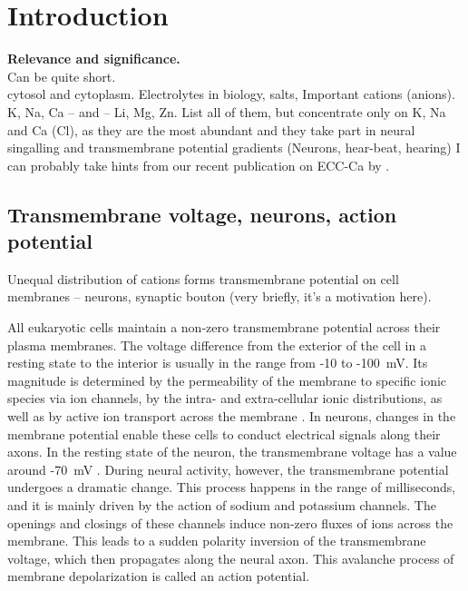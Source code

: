 \chapter*{Introduction}

 \textbf{Relevance and significance.} \\
 Can be quite short. \\
 cytosol and cytoplasm. Electrolytes in biology, salts, Important cations (anions). 
 K, Na, Ca -- and -- Li, Mg, Zn.
 List all of them, but concentrate only on K, Na and Ca (Cl), as they are the most abundant and they take part in neural singalling and transmembrane potential gradients (Neurons, hear-beat, hearing)
 I can probably take hints from our recent publication on ECC-Ca by \citet{martinek17}. 

\section{Transmembrane voltage, neurons, action potential}

 Unequal distribution of cations forms transmembrane potential on cell membranes -- neurons, synaptic bouton (very briefly, it's a motivation here). 

All eukaryotic cells maintain a non-zero transmembrane potential across their plasma membranes. 
The voltage difference from the exterior of the cell in a resting state to the interior is usually in the range from -10 to -100~mV. \cite{MolBiolCell, sten-knudsen_biological_2002} 
Its magnitude is determined by the permeability of the membrane to specific ionic species via ion channels, by the intra- and extra-cellular ionic distributions, as well as by active ion transport across the membrane  \cite{sten-knudsen_biological_2002}. 
In neurons, changes in the membrane potential enable these cells to conduct electrical signals along their axons.  
In the resting state of the neuron, the transmembrane voltage has a value around -70~mV \cite{sten-knudsen_biological_2002}. 
During neural activity, however, the transmembrane potential undergoes a dramatic change. 
This process happens in the range of milliseconds, and it is mainly driven by the action of sodium and potassium channels. 
The openings and closings of these channels induce non-zero fluxes of ions across the membrane. 
This leads to a sudden polarity inversion of the transmembrane voltage, which then propagates along the neural axon. 
This avalanche process of membrane depolarization is called an action potential. \cite{sten-knudsen_biological_2002}


